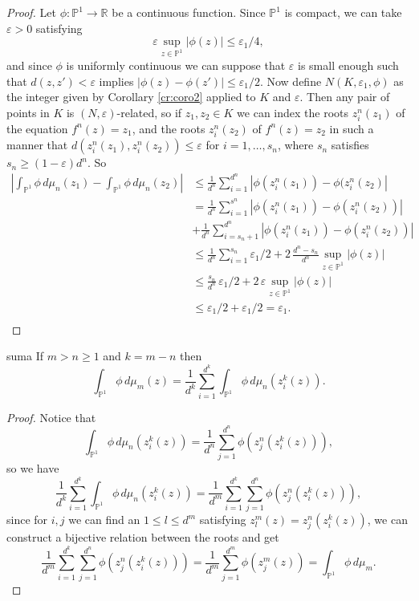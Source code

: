 \begin{proof}
Let $\phi:\mathbb{P}^1\rightarrow \mathbb{R}$ be a continuous function. Since $\mathbb{P}^1$ is compact, we can take $\varepsilon>0$ satisfying
$$\varepsilon \sup_{z\in \mathbb{P}^1}|\phi(z)| \leq \varepsilon_1/4,$$
and since $\phi$ is uniformly continuous we can suppose that $\varepsilon$ is small enough such that $d(z,z')<\varepsilon$ implies $|\phi(z)-\phi(z')| \leq \varepsilon_1/2$. Now define $N(K,\varepsilon_1,\phi)$ as the integer given by Corollary \ref{cr:coro2} applied to $K$ and $\varepsilon$. Then any pair of points in $K$ is $(N,\varepsilon)$-related, so if $z_1,z_2\in K$ we can index the roots $z_i^n(z_1)$ of the equation $f^n(z) = z_1$, and the roots $z_i^n(z_2)$ of $f^n(z) = z_2$ in such a manner that $d(z_i^n(z_1),z_i^n(z_2))\leq \varepsilon$ for $i=1,\dots, s_n$, where $s_n$ satisfies $s_n \geq (1-\varepsilon)d^n$. So
\begin{align*}
\left| \int_{\mathbb{P}^1}\phi\,d \mu_n(z_1) - \int_{\mathbb{P}^1}\phi\,d \mu_n(z_2) \right| &\leq \frac{1}{d^n} \sum_{i=1}^{d^n} | \phi(z_i^n(z_1))-\phi(z_i^n(z_2)|\\
&=\frac{1}{d^n} \sum_{i=1}^{s^n} | \phi(z_i^n(z_1))-\phi(z_i^n(z_2))|\\
&+ \frac{1}{d^n} \sum_{i=s_n+1}^{d^n} | \phi(z_i^n(z_1))-\phi(z_i^n(z_2))|\\
&\leq  \frac{1}{d^n} \sum_{i=1}^{s_n} \varepsilon_1/2 + 2\,\frac{d^n-s_n}{d^n} \sup_{z\in \mathbb{P}^1}|\phi(z)|\\
& \leq \frac{s_n}{d^n} \, \varepsilon_1/2 +2\, \varepsilon \sup_{z\in \mathbb{P}^1}|\phi(z)| \\
&\leq \varepsilon_1/2 + \varepsilon_1/2 = \varepsilon_1.\\
\end{align*}
\end{proof}

\begin{mylema}{}{suma}
If $m>n\geq 1$ and $k=m-n$ then
$$\int_{\mathbb{P}^1} \phi \, d\mu_m(z) = \frac{1}{d^k} \sum_{i=1}^{d^k} \int_{\mathbb{P}^1} \phi \,d\mu_n(z_i^k(z)).$$
\end{mylema}

\begin{proof}
Notice that
$$\int_{\mathbb{P}^1} \phi \, d\mu_n(z_i^k(z)) = \frac{1}{d^n} \sum_{j=1}^{d^n} \phi (z_j^n(z_i^k(z))),$$
so we have
$$\frac{1}{d^k}\sum_{i=1}^{d^k} \int_{\mathbb{P}^1} \phi \,d\mu_n(z_i^k(z)) = \frac{1}{d^m}\sum_{i=1}^{d^k}\sum_{j=1}^{d^n} \phi (z_j^n(z_i^k(z))),$$
since for $i,j$ we can find an $1\leq l \leq d^m$ satisfying $z_l^m(z) = z_j^n(z_i^k(z))$, we can construct a bijective relation between the roots and get
$$\frac{1}{d^m}\sum_{i=1}^{d^k}\sum_{j=1}^{d^n} \phi (z_j^n(z_i^k(z))) = \frac{1}{d^m} \sum_{j=1}^{d^m} \phi(z_j^m(z)) = \int_{\mathbb{P}^1} \phi \,d\mu_m.$$
\end{proof}

